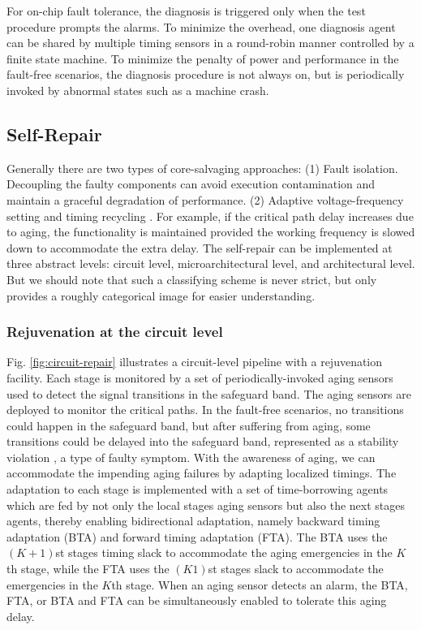 For on-chip fault tolerance, the diagnosis is triggered only when the test procedure prompts the alarms. To minimize the overhead, one diagnosis agent can be shared by multiple timing sensors in a round-robin manner \cite{yan2011revivenet} controlled by a finite state machine. To minimize the penalty of power and performance in the fault-free scenarios, the diagnosis procedure is not always on, but is periodically invoked by abnormal states such as a machine crash.

\subsection{Self-Repair}
Generally there are two types of core-salvaging approaches: (1) Fault isolation. Decoupling the faulty components \cite{aitken2012yield} can avoid execution contamination and maintain a graceful degradation of performance. (2) Adaptive voltage-frequency setting and timing recycling \cite{tschanz201045nm}. For example, if the critical path delay increases due to aging, the functionality is maintained provided the working frequency is slowed down to accommodate the extra delay. The self-repair can be implemented at three abstract levels: circuit level, microarchitectural level, and architectural level. But we should note that such a classifying scheme is never strict, but only provides a roughly categorical image for easier understanding.

\subsubsection{Rejuvenation at the circuit level}
Fig. \ref{fig:circuit-repair} illustrates a circuit-level pipeline with a rejuvenation facility. Each stage is monitored by a set of periodically-invoked aging sensors used to detect the signal transitions in the safeguard band. The aging sensors are deployed to monitor the critical paths. In the fault-free scenarios, no transitions could happen in the safeguard band, but after suffering from aging, some transitions could be delayed into the safeguard band, represented as a stability violation \cite{yan2010svfd}, a type of faulty symptom. With the awareness of aging, we can accommodate the impending aging failures by adapting localized timings. The adaptation to each stage is implemented with a set of time-borrowing agents which are fed by not only the local stages aging sensors but also the next stages agents, thereby enabling bidirectional adaptation, namely backward timing adaptation (BTA) and forward timing adaptation (FTA). The BTA uses the $(K + 1)$st stages timing slack to accommodate the aging emergencies in the $K$th stage, while the FTA uses the $(K1)$st stages slack to accommodate the emergencies in the $K$th stage. When an aging sensor detects an alarm, the BTA, FTA, or BTA and FTA can be simultaneously enabled to tolerate this aging delay.

